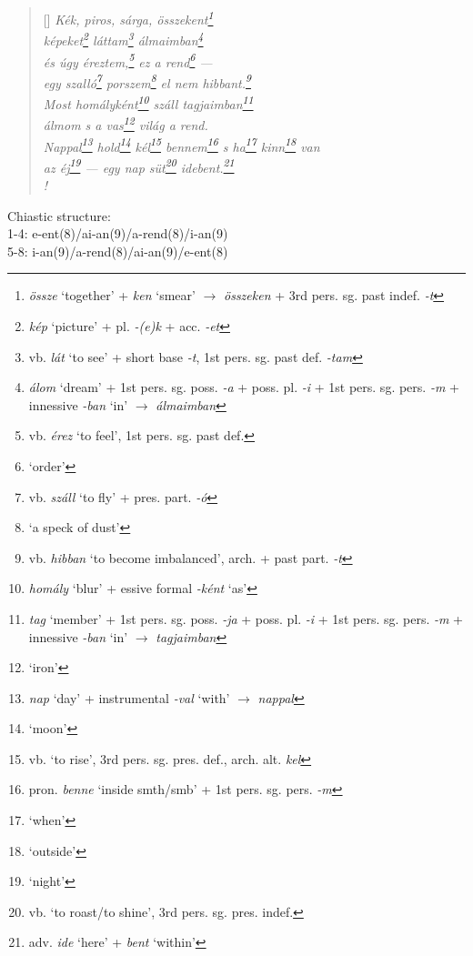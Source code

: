 \documentclass[a4paper,12pt,twoside,final]{book}
\begin{document}
\begin{verse}[\versewidth]
  \it
  Kék, piros, sárga, összekent\footnote{\emph{össze} `together' +
  \emph{ken} `smear' $\rightarrow$ \emph{összeken} + 3rd
  pers. sg. past indef. \emph{-t}} \\
  képeket\footnote{\emph{kép} `picture' + pl. \emph{-(e)k} +
  acc. \emph{-et}} láttam\footnote{vb. \emph{lát} `to see' +
  short base \emph{-t}, 1st pers. sg. past def. \emph{-tam}}
  álmaimban\footnote{\emph{álom} `dream' +
  1st pers. sg. poss. \emph{-a} + poss. pl. \emph{-i} + 1st
  pers. sg. pers. \emph{-m} + innessive \emph{-ban} `in' $\rightarrow$
  \emph{álmaimban}} \\
  és úgy éreztem,\footnote{vb. \emph{érez} `to feel', 1st
  pers. sg. past def.} ez a rend\footnote{`order'} --- \\
  egy szalló\footnote{vb. \emph{száll} `to fly' +
  pres. part. \emph{-ó}} porszem\footnote{`a speck of dust'} el nem
  hibbant.\footnote{vb. \emph{hibban}
  `to become imbalanced', arch. + past part. \emph{-t}} \\
  Most homályként\footnote{\emph{homály} `blur' +
  essive formal \emph{-ként} `as'} száll tagjaimban\footnote{\emph{tag}
  `member' + 1st pers. sg. poss. \emph{-ja} +
  poss. pl. \emph{-i} + 1st pers. sg. pers. \emph{-m} +
  innessive \emph{-ban} `in' $\rightarrow$ \emph{tagjaimban}} \\
  álmom s a vas\footnote{`iron'} világ a rend. \\
  Nappal\footnote{\emph{nap} `day' + instrumental \emph{-val}
  `with' $\rightarrow$ \emph{nappal}} hold\footnote{`moon'}
  kél\footnote{vb. `to rise', 3rd pers. sg. pres. def.,
  arch. alt. \emph{kel}} bennem\footnote{pron. \emph{benne} `inside
  smth/smb' + 1st pers. sg. pers. \emph{-m}} s ha\footnote{`when'}
  kinn\footnote{`outside'} van  \\
  az éj\footnote{`night'} --- egy nap süt\footnote{vb. `to
  roast/to shine', 3rd pers. sg. pres. indef.}
  idebent.\footnote{adv. \emph{ide} `here' + \emph{bent} `within'} \\!
\end{verse}

\noindent Chiastic structure: \\
1-4: e-ent(8)/ai-an(9)/a-rend(8)/i-an(9) \\
5-8: i-an(9)/a-rend(8)/ai-an(9)/e-ent(8)

\newpage
\end{document}
